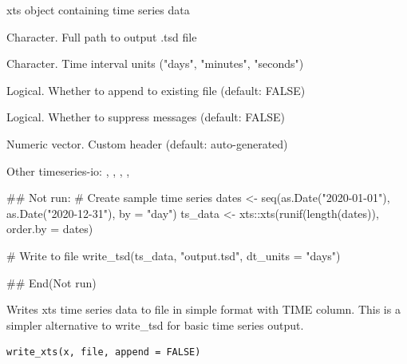\documentclass[a4paper]{book}
\begin{document}
%
\begin{Arguments}
\begin{ldescription}
\item[\code{x}] xts object containing time series data

\item[\code{file}] Character. Full path to output .tsd file

\item[\code{dt\_units}] Character. Time interval units ("days", "minutes", "seconds")

\item[\code{append}] Logical. Whether to append to existing file (default: FALSE)

\item[\code{quiet}] Logical. Whether to suppress messages (default: FALSE)

\item[\code{header}] Numeric vector. Custom header (default: auto-generated)
\end{ldescription}
\end{Arguments}
%
\begin{SeeAlso}\relax
Other timeseries-io: 
,
,
,
,
\end{SeeAlso}
%
\begin{Examples}
\begin{ExampleCode}
## Not run: 
# Create sample time series
dates <- seq(as.Date("2020-01-01"), as.Date("2020-12-31"), by = "day")
ts_data <- xts::xts(runif(length(dates)), order.by = dates)

# Write to file
write_tsd(ts_data, "output.tsd", dt_units = "days")

## End(Not run)
\end{ExampleCode}
\end{Examples}
%
\begin{Description}\relax
Writes xts time series data to file in simple format with TIME column.
This is a simpler alternative to write\_tsd for basic time series output.
\end{Description}
%
\begin{Usage}
\begin{verbatim}
write_xts(x, file, append = FALSE)
\end{verbatim}
\end{Usage}
\end{document}
